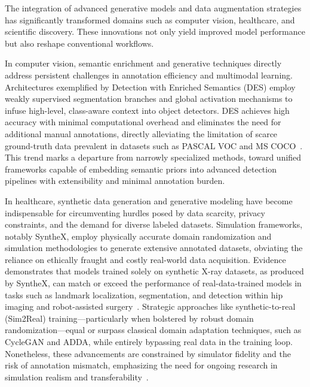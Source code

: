 \documentclass[sigconf]{acmart}
\begin{document}
The integration of advanced generative models and data augmentation strategies has significantly transformed domains such as computer vision, healthcare, and scientific discovery. These innovations not only yield improved model performance but also reshape conventional workflows.

In computer vision, semantic enrichment and generative techniques directly address persistent challenges in annotation efficiency and multimodal learning. Architectures exemplified by Detection with Enriched Semantics (DES) employ weakly supervised segmentation branches and global activation mechanisms to infuse high-level, class-aware context into object detectors. DES achieves high accuracy with minimal computational overhead and eliminates the need for additional manual annotations, directly alleviating the limitation of scarce ground-truth data prevalent in datasets such as PASCAL VOC and MS COCO~\cite{ref61}. This trend marks a departure from narrowly specialized methods, toward unified frameworks capable of embedding semantic priors into advanced detection pipelines with extensibility and minimal annotation burden.

In healthcare, synthetic data generation and generative modeling have become indispensable for circumventing hurdles posed by data scarcity, privacy constraints, and the demand for diverse labeled datasets. Simulation frameworks, notably SyntheX, employ physically accurate domain randomization and simulation methodologies to generate extensive annotated datasets, obviating the reliance on ethically fraught and costly real-world data acquisition. Evidence demonstrates that models trained solely on synthetic X-ray datasets, as produced by SyntheX, can match or exceed the performance of real-data-trained models in tasks such as landmark localization, segmentation, and detection within hip imaging and robot-assisted surgery~\cite{ref65}. Strategic approaches like synthetic-to-real (Sim2Real) training---particularly when bolstered by robust domain randomization---equal or surpass classical domain adaptation techniques, such as CycleGAN and ADDA, while entirely bypassing real data in the training loop. Nonetheless, these advancements are constrained by simulator fidelity and the risk of annotation mismatch, emphasizing the need for ongoing research in simulation realism and transferability~\cite{ref65,ref75}.
\end{document}
